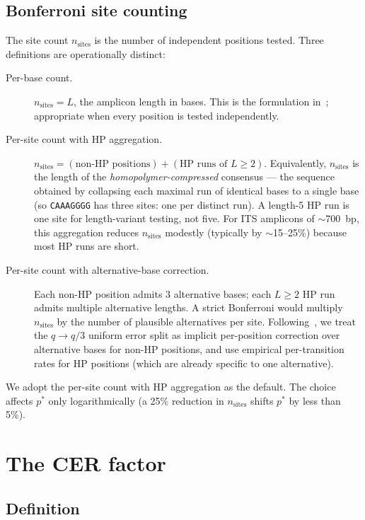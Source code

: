 \documentclass[11pt]{article}
\begin{document}
\subsection{Bonferroni site counting}
\label{sec:nsites}

The site count $n_\text{sites}$ is the number of independent positions tested.
Three definitions are operationally distinct:

\begin{description}
\item[Per-base count.] $n_\text{sites} = L$, the amplicon length in bases.
This is the formulation in~\cite{cer_paper}; appropriate when every position
is tested independently.

\item[Per-site count with HP aggregation.] $n_\text{sites} = (\text{non-HP positions}) + (\text{HP runs of } L \geq 2)$.
Equivalently, $n_\text{sites}$ is the length of the \emph{homopolymer-compressed}
consensus --- the sequence obtained by collapsing each maximal run of identical
bases to a single base (so \texttt{CAAAGGGG} has three sites: one per distinct
run). A length-5 HP run is one site for length-variant testing, not five. For
ITS amplicons of $\sim$700~bp, this aggregation reduces $n_\text{sites}$
modestly (typically by $\sim$15--25\%) because most HP runs are short.

\item[Per-site count with alternative-base correction.] Each non-HP position
admits 3 alternative bases; each $L \geq 2$ HP run admits multiple alternative
lengths. A strict Bonferroni would multiply $n_\text{sites}$ by the number of
plausible alternatives per site. Following~\cite{cer_paper}, we treat the $q
\to q/3$ uniform error split as implicit per-position correction over alternative
bases for non-HP positions, and use empirical per-transition rates for HP
positions (which are already specific to one alternative).
\end{description}

We adopt the per-site count with HP aggregation as the default. The choice
affects $p^*$ only logarithmically (a 25\% reduction in $n_\text{sites}$
shifts $p^*$ by less than 5\%).

\section{The CER factor}
\label{sec:factor}

\subsection{Definition}
\end{document}
